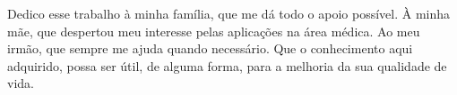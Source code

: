 Dedico esse trabalho à minha família, que me dá todo o apoio possível. À minha mãe, que despertou meu interesse pelas aplicações na área médica. Ao meu irmão, que sempre me ajuda quando necessário. Que o conhecimento aqui adquirido, possa ser útil, de alguma forma, para a melhoria da sua qualidade de vida.